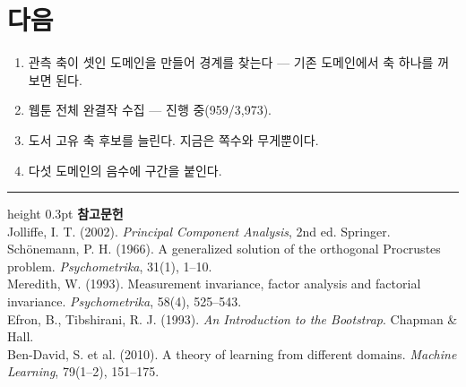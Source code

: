 \documentclass[10pt]{article}
\begin{document}
\section{다음}

\begin{enumerate}[leftmargin=1.3em,itemsep=0.15em]
\item 관측 축이 셋인 도메인을 만들어 경계를 찾는다 --- 기존 도메인에서 축 하나를
      꺼 보면 된다.
\item 웹툰 전체 완결작 수집 --- 진행 중(959/3,973).
\item 도서 고유 축 후보를 늘린다. 지금은 쪽수와 무게뿐이다.
\item 다섯 도메인의 음수에 구간을 붙인다.
\end{enumerate}

\vspace{0.6em}
\hrule height 0.3pt
\vspace{0.5em}
{\footnotesize
\textbf{참고문헌}\\[0.3em]
Jolliffe, I. T. (2002). \emph{Principal Component Analysis}, 2nd ed. Springer.\\[0.15em]
Schönemann, P. H. (1966). A generalized solution of the orthogonal Procrustes
problem. \emph{Psychometrika}, 31(1), 1--10.\\[0.15em]
Meredith, W. (1993). Measurement invariance, factor analysis and factorial
invariance. \emph{Psychometrika}, 58(4), 525--543.\\[0.15em]
Efron, B., Tibshirani, R. J. (1993). \emph{An Introduction to the Bootstrap}.
Chapman \& Hall.\\[0.15em]
Ben-David, S. et al. (2010). A theory of learning from different domains.
\emph{Machine Learning}, 79(1--2), 151--175.
}
\end{document}
